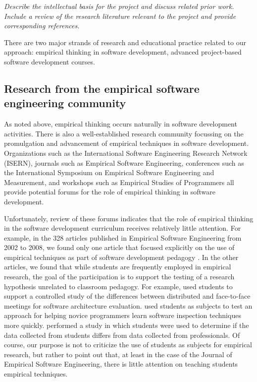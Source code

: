 {\em Describe the intellectual basis for the project and discuss related prior work.  Include a review of the research literature relevant to the project and provide corresponding references. }

There are two major strands of research and educational practice related to our approach: empirical thinking in software development, advanced project-based software development courses. 

\subsection*{Research from the empirical software engineering community}

As noted above, empirical thinking occurs naturally in software development
activities.  There is also a well-established research community focussing
on the promulgation and advancement of empirical techniques in software
development.  Organizations such as the International Software Engineering
Research Network (ISERN), journals such as Empirical Software Engineering,
conferences such as the International Symposium on Empirical Software
Engineering and Measurement, and workshops such as Empirical Studies of
Programmers all provide potential forums for the role of empirical thinking
in software development.

Unfortunately, review of these forums indicates that the role of empirical
thinking in the software development curriculum receives relatively little
attention.  For example, in the 328 articles published in Empirical
Software Engineering from 2002 to 2008, we found only one article that
focused explicitly on the use of empirical techniques as part of software
development pedagogy \cite{Pfahl03}.  In the other articles, we found that
while students are frequently employed in empirical research, the goal of
the participation is to support the testing of a research hypothesis
unrelated to classroom pedagogy.  For example, \cite{Babar08} used students
to support a controlled study of the differences between distributed and
face-to-face meetings for software architecture evaluation.
\cite{Carver06} used students as subjects to test an approach for helping
novice programmers learn software inspection techniques more quickly.
\cite{Host00} performed a study in which students were used to determine if
the data collected from students differs from data collected from
professionals.  Of course, our purpose is not to criticize the use of
students as subjects for empirical research, but rather to point out that,
at least in the case of the Journal of Empirical Software Engineering,
there is little attention on teaching students empirical techniques.

